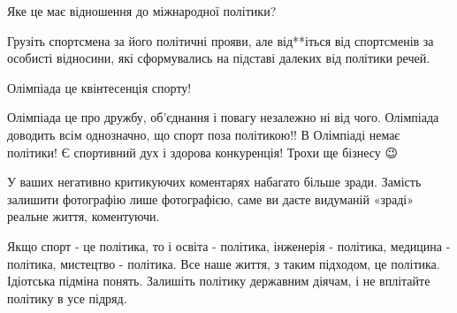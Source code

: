 Яке це має відношення до міжнародної  політики?

Грузіть спортсмена за його політичні прояви, але від**іться від спортсменів за
особисті відносини, які сформувались на підставі далеких від політики речей.

Олімпіада це квінтесенція спорту!

Олімпіада це про дружбу, об’єднання і повагу незалежно ні від чого. Олімпіада
доводить всім однозначно, що спорт поза політикою!! В Олімпіаді немає політики!
Є спортивний дух і здорова конкуренція! Трохи ще бізнесу 😉

У ваших негативно критикуючих коментарях набагато більше зради. Замість
залишити фотографію лише фотографією, саме ви даєте видуманій «зраді» реальне
життя, коментуючи.

Якщо спорт - це політика, то і освіта - політика, інженерія - політика,
медицина - політика, мистецтво - політика. Все наше життя, з таким підходом, це
політика. Ідіотська підміна понять. Залишіть політику державним діячам, і не
вплітайте політику в усе підряд.
